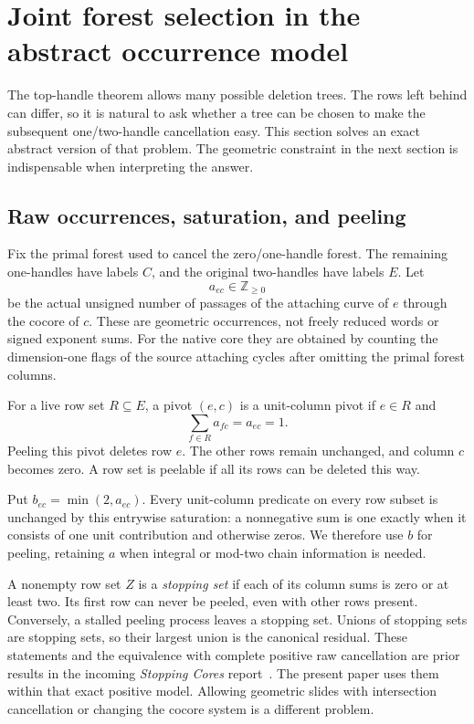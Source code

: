 \section{Joint forest selection in the abstract occurrence model}
\label{sec:joint}

The top-handle theorem allows many possible deletion trees. The rows left
behind can differ, so it is natural to ask whether a tree can be chosen to
make the subsequent one/two-handle cancellation easy. This section solves
an exact abstract version of that problem. The geometric constraint in the
next section is indispensable when interpreting the answer.

\subsection{Raw occurrences, saturation, and peeling}

Fix the primal forest used to cancel the zero/one-handle forest. The
remaining one-handles have labels $C$, and the original two-handles have
labels $E$. Let
\[
 a_{ec}\in\mathbb Z_{\geq0}
\]
be the actual unsigned number of passages of the attaching curve of $e$
through the cocore of $c$. These are geometric occurrences, not freely
reduced words or signed exponent sums. For the native core they are obtained
by counting the dimension-one flags of the source attaching cycles after
omitting the primal forest columns.

\begin{definition}
For a live row set $R\subseteq E$, a pivot $(e,c)$ is a unit-column pivot
if $e\in R$ and
\[
 \sum_{f\in R} a_{fc}=a_{ec}=1.
\]
Peeling this pivot deletes row $e$. The other rows remain unchanged, and
column $c$ becomes zero. A row set is peelable if all its rows can be
deleted this way.
\end{definition}

Put $b_{ec}=\min(2,a_{ec})$. Every unit-column predicate on every row
subset is unchanged by this entrywise saturation: a nonnegative sum is one
exactly when it consists of one unit contribution and otherwise zeros. We
therefore use $b$ for peeling, retaining $a$ when integral or mod-two chain
information is needed.

A nonempty row set $Z$ is a \emph{stopping set} if each of its column sums
is zero or at least two. Its first row can never be peeled, even with other
rows present. Conversely, a stalled peeling process leaves a stopping set.
Unions of stopping sets are stopping sets, so their largest union is the
canonical residual. These statements and the equivalence with complete
positive raw cancellation are prior results in the incoming
\emph{Stopping Cores} report~\cite{incoming-stopping}. The present paper
uses them within that exact positive model. Allowing geometric slides with
intersection cancellation or changing the cocore system is a different
problem.

